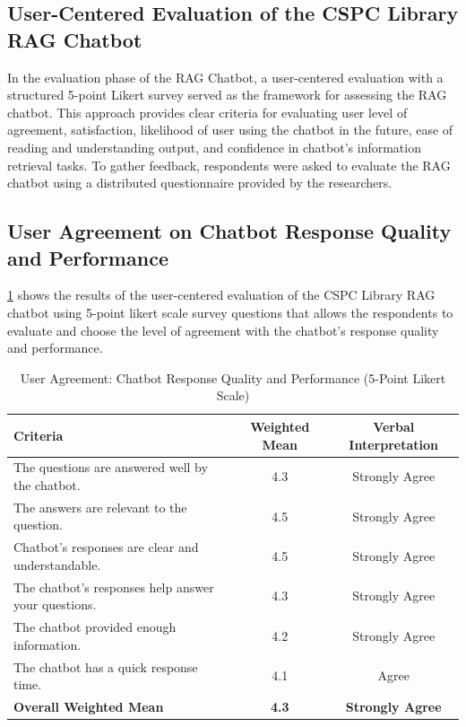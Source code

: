 \begin{refsection}
\section*{User-Centered Evaluation of the CSPC Library RAG Chatbot}
In the evaluation phase of the RAG Chatbot, a user-centered evaluation with a structured 5-point Likert survey served as the framework for assessing the RAG chatbot. This approach provides clear criteria for evaluating user level of agreement, satisfaction, likelihood of user using the chatbot in the future, ease of reading and understanding output, and confidence in chatbot’s information retrieval tasks. To gather feedback, respondents were asked to evaluate the RAG chatbot using a distributed questionnaire provided by the researchers.

\subsection{User Agreement on Chatbot Response Quality and Performance}
\ref{tab:user_agreement_quality} shows the results of the user-centered evaluation of the CSPC Library RAG chatbot using 5-point likert scale survey questions that allows the respondents to evaluate and choose the level of agreement with the chatbot’s response quality and performance.

\begin{table}[H]
    \centering
    \caption{User Agreement: Chatbot Response Quality and Performance (5-Point Likert Scale)}
    \label{tab:user_agreement_quality}
    \begin{tabular}{p{7cm} c c}
        \hline
        \textbf{Criteria} & \textbf{Weighted Mean} & \textbf{Verbal Interpretation} \\
        \hline
        The questions are answered well by the chatbot. & 4.3 & Strongly Agree \\
        \hline
        The answers are relevant to the question. & 4.5 & Strongly Agree \\
        \hline
        Chatbot’s responses are clear and understandable. & 4.5 & Strongly Agree \\
        \hline
        The chatbot’s responses help answer your questions. & 4.3 & Strongly Agree \\
        \hline
        The chatbot provided enough information. & 4.2 & Strongly Agree \\
        \hline
        The chatbot has a quick response time. & 4.1 & Agree \\
        \hline
        \textbf{Overall Weighted Mean} & \textbf{4.3} & \textbf{Strongly Agree} \\
        \hline
    \end{tabular}
\end{table}


\end{refsection}
